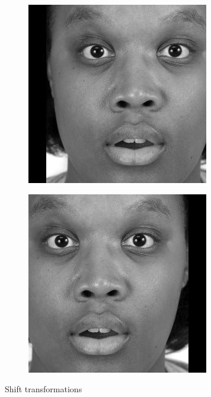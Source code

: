 \begin{figure}[H]
\begin{subfigure}[b]{.3\linewidth}
\includegraphics[width=\linewidth]{img/tests/shifts/shifted_image2.jpg}
\end{subfigure}
\begin{subfigure}[b]{.3\linewidth}
\includegraphics[width=\linewidth]{img/tests/shifts/shifted_image3.jpg}
\end{subfigure}
\caption{Shift transformations}
\end{figure}


